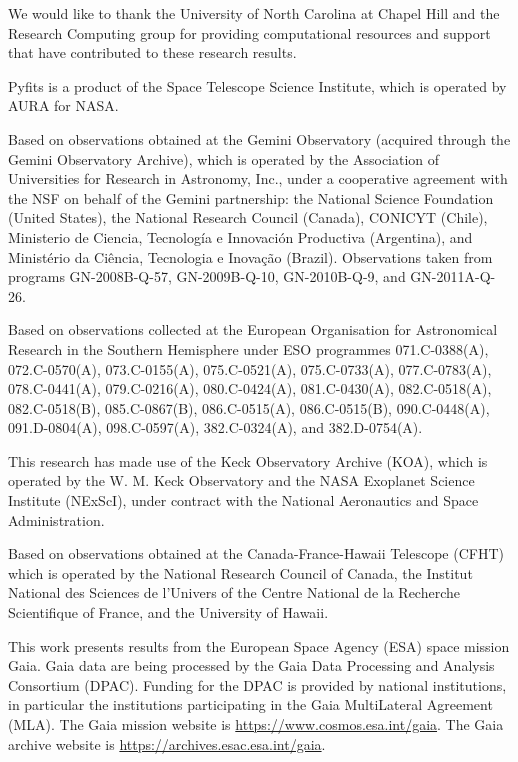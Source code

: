 \documentclass[twocolumn]{aastex62}
\begin{document}
We would like to thank the University of North Carolina at Chapel Hill and the Research Computing group for providing computational resources and support that have contributed to these research results.

Pyfits is a product of the Space Telescope Science Institute, which is operated by AURA for NASA.

Based on observations obtained at the Gemini Observatory (acquired through the Gemini Observatory Archive), which is operated by the Association of Universities for Research in Astronomy, Inc., under a cooperative agreement with the NSF on behalf of the Gemini partnership: the National Science Foundation (United States), the National Research Council (Canada), CONICYT (Chile), Ministerio de Ciencia, Tecnolog\'{i}a e Innovaci\'{o}n Productiva (Argentina), and Minist\'{e}rio da Ci\^{e}ncia, Tecnologia e Inova\c{c}\~{a}o (Brazil). Observations taken from programs GN-2008B-Q-57, GN-2009B-Q-10, GN-2010B-Q-9, and GN-2011A-Q-26.

Based on observations collected at the European Organisation for Astronomical Research in the Southern Hemisphere under ESO programmes 071.C-0388(A), 072.C-0570(A), 073.C-0155(A), 075.C-0521(A), 075.C-0733(A), 077.C-0783(A), 078.C-0441(A), 079.C-0216(A), 080.C-0424(A), 081.C-0430(A), 082.C-0518(A), 082.C-0518(B), 085.C-0867(B), 086.C-0515(A), 086.C-0515(B), 090.C-0448(A), 091.D-0804(A), 098.C-0597(A), 382.C-0324(A), and 382.D-0754(A).

 This research has made use of the Keck Observatory Archive (KOA), which is operated by the W. M. Keck Observatory and the NASA Exoplanet Science Institute (NExScI), under contract with the National Aeronautics and Space Administration. 

Based on observations obtained at the Canada-France-Hawaii Telescope (CFHT) which is operated by the National Research Council of Canada, the Institut National des Sciences de l'Univers of the Centre National de la Recherche Scientifique of France, and the University of Hawaii. 

This work presents results from the European Space Agency (ESA) space mission Gaia. Gaia data are being processed by the Gaia Data Processing and Analysis Consortium (DPAC). Funding for the DPAC is provided by national institutions, in particular the institutions participating in the Gaia MultiLateral Agreement (MLA). The Gaia mission website is \href{https://www.cosmos.esa.int/gaia}{https://www.cosmos.esa.int/gaia}. The Gaia archive website is \href{https://archives.esac.esa.int/gaia}{https://archives.esac.esa.int/gaia}.
\end{document}
